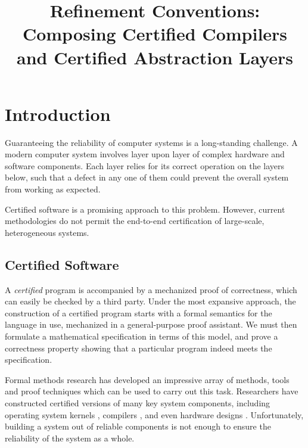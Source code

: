 \documentclass[sigplan,10pt,review,anonymous]{acmart}
\title{%
  Refinement Conventions:
  Composing Certified Compilers and Certified Abstraction Layers}
\begin{document}
\maketitle

\section{Introduction} %

Guaranteeing the reliability of computer systems
is a long-standing challenge.
A modern computer system involves
layer upon layer of complex hardware and software components.
Each layer relies for its correct operation
on the layers below,
such that a defect in any one of them
could prevent the overall system from
working as expected.

Certified software is a promising approach
to this problem.
However,
current methodologies do not permit
the end-to-end certification of
large-scale, heterogeneous systems.

\subsection{Certified Software}


A \emph{certified} program is accompanied by
a mechanized proof of correctness,
which can easily be checked by a third party.
Under the most expansive approach,
the construction of a certified program
starts with a formal semantics 
for the language in use,
mechanized in a general-purpose proof assistant.
We must then formulate a mathematical specification
in terms of this model,
and prove a correctness property
showing that a particular program indeed meets the specification.

Formal methods research
has developed an impressive array of
methods, tools and proof techniques
which can be used to carry out this task.
Researchers have constructed
certified versions of many key system components,
including
operating system kernels \cite{sel4,popl15},
compilers \cite{compcert},
and even hardware designs \cite{kami}.
Unfortunately,
building a system out of reliable components
is not enough to ensure
the reliability of the system as a whole.
\end{document}
